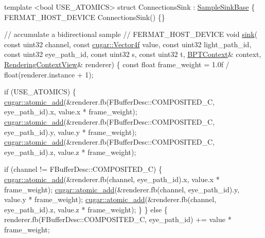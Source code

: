 \begin{DoxyCodeInclude}
    \textcolor{keyword}{template} <\textcolor{keywordtype}{bool} USE\_ATOMICS>
    \textcolor{keyword}{struct }ConnectionsSink : \hyperlink{struct_sample_sink_base}{SampleSinkBase}
    \{
        FERMAT\_HOST\_DEVICE
        ConnectionsSink() \{\}

        \textcolor{comment}{// accumulate a bidirectional sample}
        \textcolor{comment}{//}
        FERMAT\_HOST\_DEVICE
        \textcolor{keywordtype}{void} \hyperlink{struct_sample_sink_base_ab34316c125cab0da36ea2ae41e67f98f}{sink}(
            \textcolor{keyword}{const} uint32            channel,
            \textcolor{keyword}{const} \hyperlink{structcugar_1_1_vector}{cugar::Vector4f}    value,
            \textcolor{keyword}{const} uint32            light\_path\_id,
            \textcolor{keyword}{const} uint32            eye\_path\_id,
            \textcolor{keyword}{const} uint32            s,
            \textcolor{keyword}{const} uint32            t,
            \hyperlink{struct_b_p_t_context}{BPTContext}&               context,
            \hyperlink{struct_rendering_context_view}{RenderingContextView}&   renderer)
        \{
            \textcolor{keyword}{const} \textcolor{keywordtype}{float} frame\_weight = 1.0f / float(renderer.instance + 1);

            \textcolor{keywordflow}{if} (USE\_ATOMICS)
            \{
                \hyperlink{group___atomics_ga0c9d949be7ac5b6f27a232c7cd27a05c}{cugar::atomic\_add}(&renderer.fb(FBufferDesc::COMPOSITED\_C, eye\_path\_id).x, 
      value.x * frame\_weight);
                \hyperlink{group___atomics_ga0c9d949be7ac5b6f27a232c7cd27a05c}{cugar::atomic\_add}(&renderer.fb(FBufferDesc::COMPOSITED\_C, eye\_path\_id).y, 
      value.y * frame\_weight);
                \hyperlink{group___atomics_ga0c9d949be7ac5b6f27a232c7cd27a05c}{cugar::atomic\_add}(&renderer.fb(FBufferDesc::COMPOSITED\_C, eye\_path\_id).z, 
      value.z * frame\_weight);

                \textcolor{keywordflow}{if} (channel != FBufferDesc::COMPOSITED\_C)
                \{
                    \hyperlink{group___atomics_ga0c9d949be7ac5b6f27a232c7cd27a05c}{cugar::atomic\_add}(&renderer.fb(channel, eye\_path\_id).x, value.x * 
      frame\_weight);
                    \hyperlink{group___atomics_ga0c9d949be7ac5b6f27a232c7cd27a05c}{cugar::atomic\_add}(&renderer.fb(channel, eye\_path\_id).y, value.y * 
      frame\_weight);
                    \hyperlink{group___atomics_ga0c9d949be7ac5b6f27a232c7cd27a05c}{cugar::atomic\_add}(&renderer.fb(channel, eye\_path\_id).z, value.z * 
      frame\_weight);
                \}
            \}
            \textcolor{keywordflow}{else}
            \{
                renderer.fb(FBufferDesc::COMPOSITED\_C, eye\_path\_id) += value * frame\_weight;


\end{DoxyCodeInclude}
